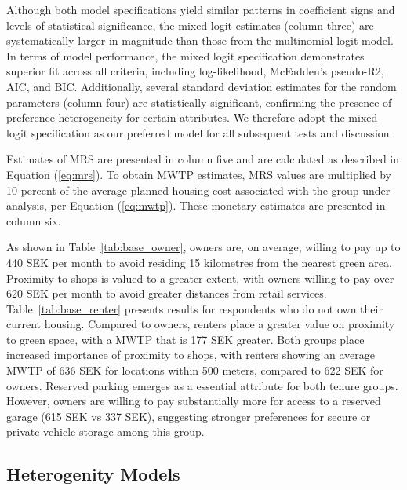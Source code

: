 \documentclass[3p,11pt ]{elsarticle}
\begin{document}



Although both model specifications yield similar patterns in coefficient signs and levels of statistical significance,
the mixed logit estimates (column three) are systematically larger in magnitude than those from the multinomial logit model.
In terms of model performance,
the mixed logit specification demonstrates superior fit across all criteria, including log-likelihood, McFadden's pseudo-R2, AIC, and BIC.
Additionally, several standard deviation estimates for the random parameters (column four) are statistically significant, confirming the presence of preference heterogeneity for certain attributes.
We therefore adopt the mixed logit specification as our preferred model for all subsequent tests and discussion.

Estimates of MRS are presented in column five and are calculated as described in Equation (\ref{eq:mrs}).
To obtain MWTP estimates,
MRS values are multiplied by 10 percent of the average planned housing cost associated with the group under analysis, per Equation (\ref{eq:mwtp}). These monetary estimates are presented in column six.

As shown in Table~\ref{tab:base_owner},
owners are, on average, willing to pay up to 440 SEK per month to avoid residing 15 kilometres from the nearest green area.
Proximity to shops is valued to a greater extent, with owners willing to pay over 620 SEK per month to avoid greater distances from retail services.
Table~\ref{tab:base_renter} presents results for respondents who do not own their current housing.
Compared to owners,
renters place a greater value on proximity to green space, with a MWTP that is 177 SEK greater.
Both groups place increased importance of proximity to shops, with renters showing an average MWTP of 636 SEK for locations within 500 meters, compared to 622 SEK for owners.
Reserved parking emerges as a essential attribute for both tenure groups.
However, owners are willing to pay substantially more for access to a reserved garage (615 SEK vs 337 SEK),
suggesting stronger preferences for secure or private vehicle storage among this group.






\clearpage


\subsection{Heterogenity Models}
\end{document}
